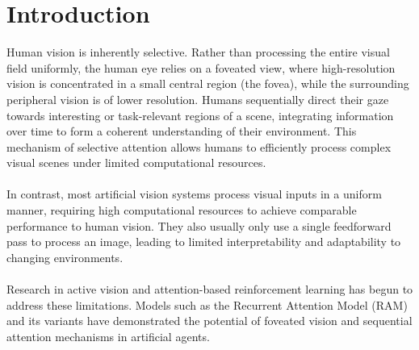 \chapter{Introduction}\label{chapter:introduction}
%
Human vision is inherently selective. Rather than processing the entire visual field uniformly, 
the human eye relies on a foveated view, where high-resolution vision is concentrated in a small central region (the fovea), 
while the surrounding peripheral vision is of lower resolution.
Humans sequentially direct their gaze towards interesting or task-relevant regions of a scene,
integrating information over time to form a coherent understanding of their environment.
This mechanism of selective attention allows humans to efficiently process complex visual scenes under limited computational resources.\\\\
%
In contrast, most artificial vision systems process visual inputs in a uniform manner,
requiring high computational resources to achieve comparable performance to human vision.
They also usually only use a single feedforward pass to process an image, leading to limited interpretability and adaptability to changing environments.\\\\
%
Research in active vision and attention-based reinforcement learning has begun to address these limitations.
Models such as the Recurrent Attention Model (RAM) \citep{mnih2014recurrentmodelsvisualattention} and its variants have demonstrated
the potential of foveated vision and sequential attention mechanisms in artificial agents.

